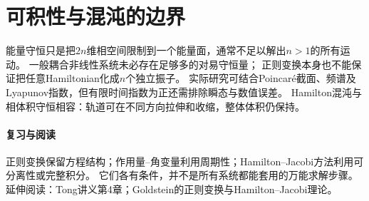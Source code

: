 \section{可积性与混沌的边界}
能量守恒只是把$2n$维相空间限制到一个能量面，通常不足以解出$n > 1$的所有运动。
一般耦合非线性系统未必存在足够多的对易守恒量；
正则变换本身也不能保证把任意Hamiltonian化成$n$个独立振子。
实际研究可结合Poincaré截面、频谱及Lyapunov指数，但有限时间指数为正还需排除瞬态与数值误差。
Hamilton混沌与相体积守恒相容：轨道可在不同方向拉伸和收缩，整体体积仍保持。

\paragraph{复习与阅读}
正则变换保留方程结构；作用量--角变量利用周期性；Hamilton--Jacobi方法利用可分离性或完整积分。
它们各有条件，并不是所有系统都能套用的万能求解步骤。
延伸阅读：Tong讲义第4章；Goldstein的正则变换与Hamilton--Jacobi理论。
